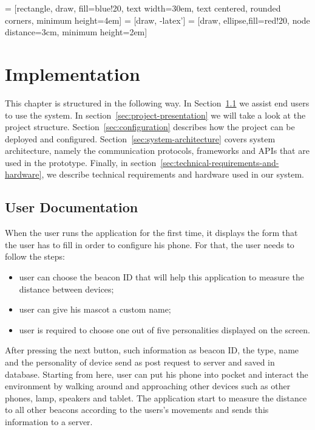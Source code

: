  = [rectangle, draw, fill=blue!20, 
    text width=30em, text centered, rounded corners, minimum height=4em]
 = [draw, -latex']
 = [draw, ellipse,fill=red!20, node distance=3cm,
    minimum height=2em]

\chapter{Implementation}
\label{ch:implementation}
This chapter is structured in the following way.
In Section~\ref{sec:user-documentation} we assist end users to use the system.
In section~\ref{sec:project-presentation} we will take a look at the project structure.
Section~\ref{sec:configuration} describes how the project can be deployed and configured.
Section~\ref{sec:system-architecture} covers system architecture, namely the
communication protocols, frameworks and APIs that are used in the prototype.
Finally, in section~\ref{sec:technical-requirements-and-hardware}, we describe technical
requirements and hardware used in our system.

\section{User Documentation}
\label{sec:user-documentation}
When the user runs the application for the first time, it displays the form that the
user has to fill in order to configure his phone.
For that, the user needs to follow the steps:

\begin{itemize}
    \item user can choose the beacon ID that will help this application to measure the distance between devices;
    \item user can give his mascot a custom name;
    \item user is required to choose one out of five personalities displayed on the screen.
\end{itemize}

After pressing the next button, such information as beacon ID,
the type, name and the personality of device send as post request to server and saved in database.
Starting from here, user can put his phone into pocket and interact the environment by walking
around and approaching other devices such as other phones, lamp, speakers and tablet.
The application start to measure the distance to all other beacons according to the users's
movements and sends this information to a server.

